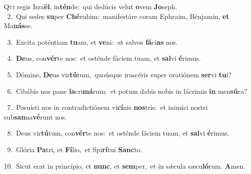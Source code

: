 \lettrine{\initial\textcolor{\initialcolor}{Q}}{ui} regis Isra\-\textbf{ël}\-, in\-\textbf{tén}\-de:~\star qui dedúcis velut \textbf{o}\-vem \textbf{Jo}\-seph.\\
{\numbfont\textcolor{\numbcolor}{~2.}}~Qui sedes \textbf{su}\-per \textbf{Ché}\-rubim:~\star manifestáre coram Ephraim, Bénjamin, \textbf{et} Ma\-\textbf{nás}\-se.\par
{\numbfont\textcolor{\numbcolor}{~3.}}~Excita poténtiam \textbf{tu}\-am, et \textbf{ve}\-ni:~\star ut salvos \textbf{fá}\-ci\textbf{as} nos.\par
{\numbfont\textcolor{\numbcolor}{~4.}}~\-\textbf{De}\-us, con\-\textbf{vér}\-te nos:~\star et osténde fáciem tuam, et \textbf{sal}\-vi \textbf{é}\-rimus.\par
{\numbfont\textcolor{\numbcolor}{~5.}}~Dómine, \textbf{De}\-us vir\-\textbf{tú}\-tum,~\star quoúsque irascéris super oratiónem \textbf{ser}\-vi \textbf{tu}\-i?\par
{\numbfont\textcolor{\numbcolor}{~6.}}~Cibábis nos pane \textbf{la}\-cri\-\textbf{má}\-rum:~\star et potum dabis nobis in lácrimis \textbf{in} men\-\textbf{sú}\-ra?\par
{\numbfont\textcolor{\numbcolor}{~7.}}~Posuísti nos in contradictiónem vi\-\textbf{cí}\-nis \textbf{nos}\-tris:~\star et inimíci nostri sub\-\textbf{san}\-na\-\textbf{vé}\-runt nos.\par
{\numbfont\textcolor{\numbcolor}{~8.}}~Deus vir\-\textbf{tú}\-tum, con\-\textbf{vér}\-te nos:~\star et osténde fáciem tuam, et \textbf{sal}\-vi \textbf{é}\-rimus.\par
{\numbfont\textcolor{\numbcolor}{~9.}}~Glória \textbf{Pa}\-tri, et \textbf{Fí}\-lio,~\star et Spi\-\textbf{rí}\-tui \textbf{Sanc}\-to.\par
{\numbfont\textcolor{\numbcolor}{10.}}~Sicut erat in princípio, et \textbf{nunc}\-, et \textbf{sem}\-per,~\star et in sǽcula sæcu\-\textbf{ló}\-rum. \textbf{A}\-men.\par
